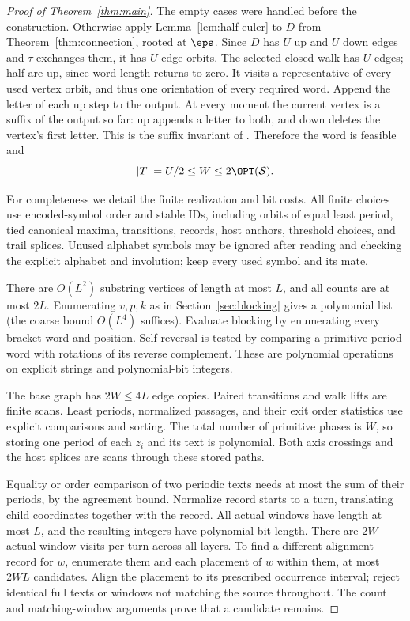 \begin{proof}[Proof of Theorem~\ref{thm:main}]
The empty cases were handled before the construction. Otherwise apply
Lemma~\ref{lem:half-euler} to $D$ from Theorem~\ref{thm:connection}, rooted at
$\eps$. Since $D$ has $U$ up and $U$ down edges and $\tau$ exchanges
them, it has $U$ edge orbits. The selected closed walk has $U$ edges;
half are up, since word length returns to zero. It visits a representative
of every used vertex orbit, and thus one orientation of every required
word. Append the letter of each up step to the output. At every moment
the current vertex is a suffix of the output so far: up appends a letter
to both, and down deletes the vertex's first letter. This is the suffix
invariant of . Therefore the word is feasible and
\begin{equation}\label{eq:final}
|T|=U/2\le W\le2\OPT(\mathcal S).
\end{equation}

For completeness we detail the finite realization and bit costs.
All finite choices use encoded-symbol order and stable IDs, including
orbits of equal least period, tied canonical maxima, transitions,
records, host anchors, threshold choices, and trail splices.
Unused alphabet symbols may be ignored after reading and checking the
explicit alphabet and involution; keep every used symbol and its mate.

There are $O(L^2)$ substring vertices of length at most $L$, and all
counts are at most $2L$. Enumerating $v,p,k$ as in Section~\ref{sec:blocking}
gives a polynomial list (the coarse bound $O(L^4)$ suffices).
Evaluate blocking by enumerating every bracket word and position.
Self-reversal is tested by comparing a primitive period word with
rotations of its reverse complement. These are polynomial operations
on explicit strings and polynomial-bit integers.

The base graph has $2W\le4L$ edge copies. Paired transitions and walk
lifts are finite scans. Least periods, normalized passages, and their
exit order statistics use explicit comparisons and sorting. The total
number of primitive phases is $W$, so storing one period of each
$z_i$ and its text is polynomial. Both axis crossings and the host
splices are scans through these stored paths.

Equality or order comparison of two periodic texts needs at most the
sum of their periods, by the agreement bound. Normalize record starts
to a turn, translating child coordinates together with the record.
All actual windows have length at most $L$, and the resulting integers
have polynomial bit length. There are $2W$ actual window visits per
turn across all layers. To find a different-alignment record for $w$,
enumerate them and each placement of $w$ within them, at most $2WL$
candidates. Align the placement to its prescribed occurrence interval;
reject identical full texts or windows not matching the source throughout.
The count and matching-window arguments prove that a candidate remains.


\end{proof}
